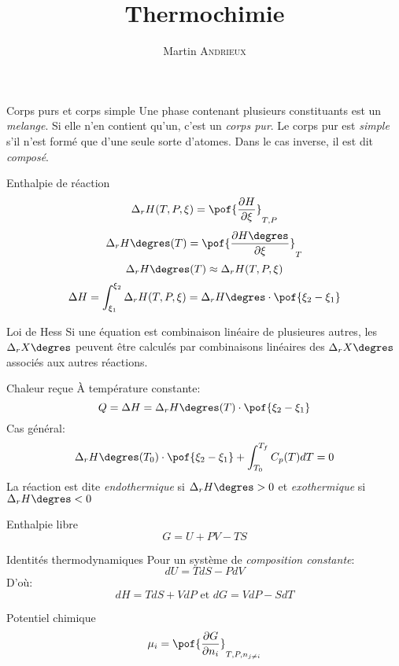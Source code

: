 \documentclass[french, a4paper, 11pt, twocolumn]{article}
\title{Thermochimie}
\author{Martin \textsc{Andrieux}}
\date{}
\newcommand{\drz}[1]{\Delta_r#1\degres}
\begin{document}
\maketitle

\begin{cadre}{Corps purs et corps simple}
  Une phase contenant plusieurs constituants est un \emph{melange}. Si elle n'en contient qu'un, c'est un \emph{corps pur}.
  Le corps pur est \emph{simple} s'il n'est formé que d'une seule sorte d'atomes. Dans le cas inverse, il est dit \emph{composé}.
\end{cadre}

\begin{cadre}{Enthalpie de réaction}
  \[\Delta_{r}H(T, P, \xi) = \pof{\dfrac{\partial H}{\partial \xi}}_{T,P}\]
  \[\drz{H}(T) = \pof{\dfrac{\partial H\degres}{\partial \xi}}_{T}\]
  \[\drz{H}(T) \approx \Delta_{r}H(T,P,\xi)\]
  \[\Delta H = \int_{\xi_{1}}^{\xi_{2}}\Delta_{r}H(T,P,\xi)=\drz{H}\cdot\pof{\xi_{2}-\xi_{1}} \]
\end{cadre}

\begin{cadre}{Loi de Hess}
  Si une équation est combinaison linéaire de plusieures autres, les $\drz{X}$ peuvent être calculés par combinaisons linéaires des $\drz{X}$ associés aux autres réactions.
\end{cadre}

\begin{cadre}{Chaleur reçue}
  À température constante:
  \[Q = \Delta H = \drz{H}(T)\cdot\pof{\xi_{2}-\xi_{1}}\]
  Cas général:
  \[\drz{H}(T_{0})\cdot\pof{\xi_{2}-\xi_{1}}+\int_{T_{0}}^{T_{f}}C_{p}(T)dT = 0 \]
  La réaction est dite \emph{endothermique} si $\drz{H} > 0$ et \emph{exothermique} si $\drz{H} < 0$
\end{cadre}

\begin{cadre}{Enthalpie libre}
  \[G = U + PV - TS\]
\end{cadre}

\begin{cadre}{Identités thermodynamiques}
  Pour un système de \emph{composition constante}:
  \[dU = TdS - PdV\]
  D'où:
  \[dH = TdS + VdP\text{ et }dG = VdP - SdT\]
\end{cadre}

\begin{cadre}{Potentiel chimique}
  \[\mu_{i} = \pof{\dfrac{\partial G}{\partial n_{i}}}_{T,P,n_{j\neq i}}\]
\end{cadre}
\end{document}
